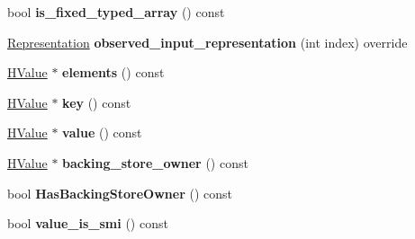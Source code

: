 \begin{DoxyCompactItemize}
\item 
bool {\bfseries is\+\_\+fixed\+\_\+typed\+\_\+array} () const \hypertarget{classv8_1_1internal_1_1_h_store_keyed_a25ff355cf65a2b3b6891e08590948619}{}\label{classv8_1_1internal_1_1_h_store_keyed_a25ff355cf65a2b3b6891e08590948619}

\item 
\hyperlink{classv8_1_1internal_1_1_representation}{Representation} {\bfseries observed\+\_\+input\+\_\+representation} (int index) override\hypertarget{classv8_1_1internal_1_1_h_store_keyed_ad2a1517ebcb6342f5cbc04c8d413819a}{}\label{classv8_1_1internal_1_1_h_store_keyed_ad2a1517ebcb6342f5cbc04c8d413819a}

\item 
\hyperlink{classv8_1_1internal_1_1_h_value}{H\+Value} $\ast$ {\bfseries elements} () const \hypertarget{classv8_1_1internal_1_1_h_store_keyed_a3cda080d15096d223a27bbbc6d882cd6}{}\label{classv8_1_1internal_1_1_h_store_keyed_a3cda080d15096d223a27bbbc6d882cd6}

\item 
\hyperlink{classv8_1_1internal_1_1_h_value}{H\+Value} $\ast$ {\bfseries key} () const \hypertarget{classv8_1_1internal_1_1_h_store_keyed_a5b0986b56dedbd1d28e6203bf8ce521d}{}\label{classv8_1_1internal_1_1_h_store_keyed_a5b0986b56dedbd1d28e6203bf8ce521d}

\item 
\hyperlink{classv8_1_1internal_1_1_h_value}{H\+Value} $\ast$ {\bfseries value} () const \hypertarget{classv8_1_1internal_1_1_h_store_keyed_a98c41e5831e0b490c5941f3a7085e272}{}\label{classv8_1_1internal_1_1_h_store_keyed_a98c41e5831e0b490c5941f3a7085e272}

\item 
\hyperlink{classv8_1_1internal_1_1_h_value}{H\+Value} $\ast$ {\bfseries backing\+\_\+store\+\_\+owner} () const \hypertarget{classv8_1_1internal_1_1_h_store_keyed_a6b8fe33ab6f75d399158d098cd5198bf}{}\label{classv8_1_1internal_1_1_h_store_keyed_a6b8fe33ab6f75d399158d098cd5198bf}

\item 
bool {\bfseries Has\+Backing\+Store\+Owner} () const \hypertarget{classv8_1_1internal_1_1_h_store_keyed_a2cacf58e3fc8c37826f7c8885f9b4779}{}\label{classv8_1_1internal_1_1_h_store_keyed_a2cacf58e3fc8c37826f7c8885f9b4779}

\item 
bool {\bfseries value\+\_\+is\+\_\+smi} () const \hypertarget{classv8_1_1internal_1_1_h_store_keyed_af0355b1c98ce7eb497d7d2806d2dcecc}{}\label{classv8_1_1internal_1_1_h_store_keyed_af0355b1c98ce7eb497d7d2806d2dcecc}


\end{DoxyCompactItemize}
